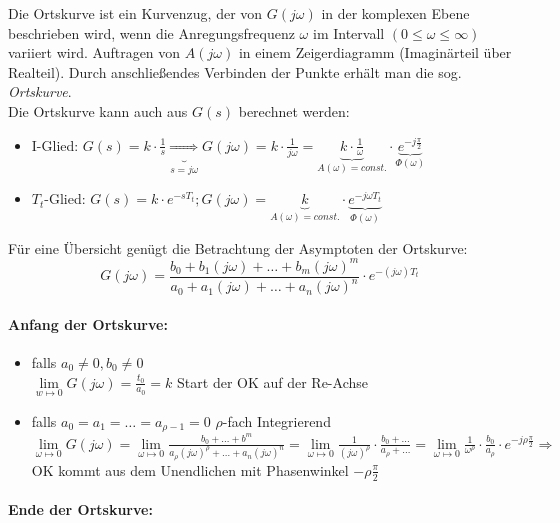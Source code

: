 \documentclass[12pt,a4paper,ngerman]{scrartcl}
\begin{document}
Die Ortskurve ist ein Kurvenzug, der von $G(j\omega)$ in der komplexen Ebene beschrieben wird, wenn die Anregungsfrequenz $\omega$ im Intervall $(0\leq \omega \leq \infty)$ variiert wird.
Auftragen von $A(j\omega)$ in einem Zeigerdiagramm (Imaginärteil über Realteil). Durch anschließendes Verbinden der Punkte erhält man die sog. \emph{Ortskurve}.\\
Die Ortskurve kann auch aus $G(s)$ berechnet werden:
\begin{itemize}
\item I-Glied: $G(s)=k\cdot \frac{1}{s} \underbrace{\Rightarrow}_{s=j\omega}G(j\omega)=k\cdot \frac{1}{j\omega}=\underbrace{k\cdot \frac{1}{\omega}}_{A(\omega)=const.}\cdot \underbrace{e^{-j\frac{\pi}{2}}}_{\Phi(\omega)}$
\item $T_t$-Glied: $G(s)=k\cdot e^{-sT_t}; G(j\omega)=\underbrace{k}_{A(\omega)=const.}\cdot \underbrace{e^{-j\omega T_t}}_{\Phi(\omega)}$
\end{itemize}
Für eine Übersicht genügt die Betrachtung der Asymptoten der Ortskurve:
\[
G(j\omega)=\frac{b_0+b_1(j\omega)+\dots+b_m(j\omega)^m}{a_0+a_1(j\omega)+\dots+a_n(j\omega)^n}\cdot e^{-(j\omega)T_t}
\]

\paragraph{Anfang der Ortskurve:}

\begin{itemize}
\item falls $a_0 \neq 0, b_0 \neq 0$\\
  $\lim\limits_{w\mapsto 0}{G(j\omega)=\frac{t_0}{a_0}=k}$ Start der OK auf der Re-Achse
\item falls $a_0=a_1=\dots=a_{\rho -1}=0$ $\rho$-fach Integrierend\\
$\lim\limits_{\omega \mapsto 0}{G(j\omega)}= \lim\limits_{\omega \mapsto 0}{\frac{b_0+\dots+b^m}{a_\rho(j\omega)^\rho+\dots+a_n(j\omega)^n}}=\lim\limits_{\omega \mapsto 0} {\frac{1}{(j\omega)^\rho} \cdot \frac{b_0+\dots}{a_\rho+\dots}}=\lim\limits_{\omega \mapsto 0}{\frac{1}{\omega^\rho}\cdot \frac{b_0}{a_\rho}\cdot e^{-j\rho\frac{\pi}{2}}} \Rightarrow$ OK kommt aus dem Unendlichen mit Phasenwinkel $-\rho \frac{\pi}{2}$
\end{itemize}

\paragraph{Ende der Ortskurve:}
\end{document}
